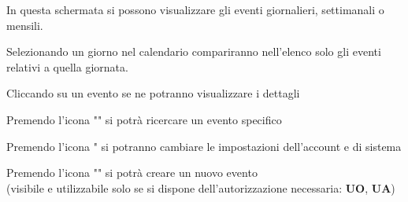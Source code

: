 \documentclass{article}
\begin{document}
\begin{description}
\begin{center}
        \end{center}
    \item[] In questa schermata si possono visualizzare gli eventi giornalieri, settimanali o mensili.
    \item[] Selezionando un giorno nel calendario compariranno nell'elenco solo gli eventi relativi a quella giornata.
    \item[] Cliccando su un evento se ne potranno visualizzare i dettagli
    \item[] Premendo l'icona "" si potrà ricercare un evento specifico
    \item[] Premendo l'icona " si potranno cambiare le impostazioni dell'account e di sistema
    \item[] Premendo l'icona "" si potrà creare un nuovo evento \\ (visibile e utilizzabile solo se si dispone dell'autorizzazione necessaria: \textbf{UO}, \textbf{UA})
\end{description}
\clearpage
\end{document}
